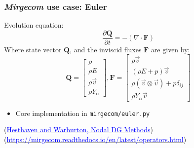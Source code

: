 \begin{frame}\frametitle{\textit{Mirgecom} use case: Euler}
\begin{center}
Evolution equation:
\begin{equation}
  \frac{\partial\mathbf{Q}}{\partial{t}} = - (\nabla \cdot \mathbf{F})
\end{equation}
Where state vector $\mathbf{Q}$, and the inviscid fluxes $\mathbf{F}$ are given by:
\begin{equation}
\mathbf{Q} = \begin{bmatrix} \rho\\\rho{E}\\\rho\vec{v}\\\rho{Y}_\alpha\end{bmatrix}, \mathbf{F} = \begin{bmatrix} \rho\vec{v}\\(\rho{E} + p)\vec{v}\\\rho(\vec{v} \otimes \vec{v}) + p\delta_{ij}\\\rho{Y}_\alpha\vec{v}\end{bmatrix}
\end{equation}
\begin{itemize}
\item Core implementation in \texttt{mirgecom/euler.py}
\end{itemize}
(\href{https://doi.org/10.1007/978-0-387-72067-8}{\textcolor{blue}{Hesthaven and Warburton, Nodal DG Methods}})\\
(\href{https://mirgecom.readthedocs.io/en/latest/operators.html}{\textcolor{blue}{https://mirgecom.readthedocs.io/en/latest/operators.html}})\\
\end{center}
\end{frame}
%
%

